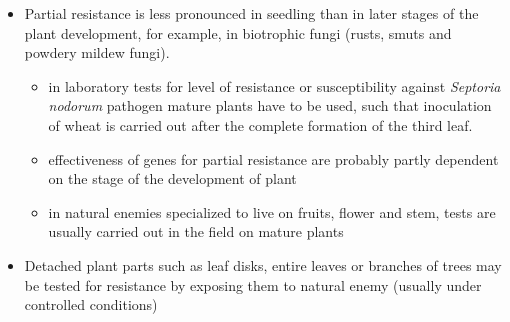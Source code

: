 \documentclass[11pt,dvipsnames,ignorenonframetext,aspectratio=169]{beamer}
\providecommand{\tightlist}{%
  \setlength{\itemsep}{0pt}\setlength{\parskip}{0pt}}
\begin{document}
\begin{frame}{}
\protect\hypertarget{section}{}
\begin{itemize}
\tightlist
\item
  Partial resistance is less pronounced in seedling than in later stages
  of the plant development, for example, in biotrophic fungi (rusts,
  smuts and powdery mildew fungi).

  \begin{itemize}
  \tightlist
  \item
    in laboratory tests for level of resistance or susceptibility
    against \emph{Septoria nodorum} pathogen mature plants have to be
    used, such that inoculation of wheat is carried out after the
    complete formation of the third leaf.
  \item
    effectiveness of genes for partial resistance are probably partly
    dependent on the stage of the development of plant
  \item
    in natural enemies specialized to live on fruits, flower and stem,
    tests are usually carried out in the field on mature plants
  \end{itemize}
\item
  Detached plant parts such as leaf disks, entire leaves or branches of
  trees may be tested for resistance by exposing them to natural enemy
  (usually under controlled conditions)
\end{itemize}
\end{frame}
\end{document}

